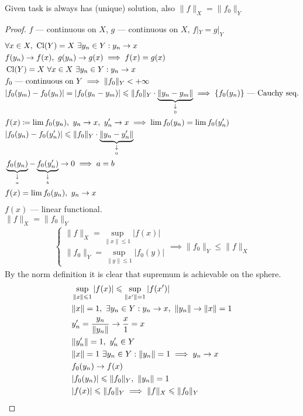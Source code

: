 \begin{thm}
  Given task is always has (unique) solution, also $\|f\|_X = \|f_0\|_Y$
\end{thm}

\begin{proof}
  $f$ --- continuous on $X$, $g$ --- continuous on $X$, $f|_Y = g|_Y$
  \begin{align*}
    &\forall x \in X,\ \cl{Y} = X\ \exists y_n \in Y : y_n \to x \\
    &f(y_n) \to f(x),\ g(y_n) \to g(x) \implies f(x) = g(x) \\
    &\cl{Y} = X\ \forall x \in X\ \exists y_n \in Y : y_n \to x\\
    &f_0\ \text{--- continuous on}\ Y \implies \|f_0\|_Y < +\infty \\
    &|f_0(y_m) - f_0(y_n)| = |f_0(y_n - y_m)| \leq \|f_0\|_Y \cdot \tendsto{\|y_n - y_m\|}{0} \implies \{f_0(y_n)\}\ \text{--- Cauchy seq.} \\
    &f(x) \coloneqq \lim f_0(y_n),\ y_n \to x,\ y_n' \to x \implies \lim f_0(y_n) = \lim f_0(y_n') \\
    &|f_0(y_n) - f_0(y_n')| \leq \|f_0\|_Y \cdot \tendsto{\|y_n - y_n'\|}{0} \\
    &\tendsto{f_0(y_n)}{a} - \tendsto{f_0(y_n')}{b} \to 0 \implies a = b \\
    &f(x) = \lim f_0(y_n),\ y_n \to x
  \end{align*}
  $f(x)$ --- linear functional. \\
  $\|f\|_X = \|f_0\|_Y$
  \begin{align*}
    \begin{cases}
      \|f\|_X = \sup\limits_{\|x\| \leq 1} |f(x)| \\
      \|f_0\|_Y = \sup\limits_{\|y\| \leq 1} |f_0(y)|
    \end{cases}
    \implies \|f_0\|_Y \leq \|f\|_X
  \end{align*}
  By the norm definition it is clear that supremum is achievable on the sphere.
  \begin{align*}
    &\sup_{\|x\| \leq 1}|f(x)| \leq \sup_{\|x'\| = 1} |f(x')| \\
    &\|x\| = 1,\ \exists y_n \in Y : y_n \to x,\ \|y_n\| \to \|x\| = 1 \\
    &y_n' = \dfrac{y_n}{\|y_n\|} \to \dfrac x1 = x \\
    &\|y_n'\| = 1,\ y_n' \in Y \\
    &\|x\| = 1\ \exists y_n \in Y : \|y_n\| = 1 \implies y_n \to x \\
    &f_0(y_n) \to f(x) \\
    &|f_0(y_n)| \leq \|f_0\|_Y,\ \|y_n\| = 1 \\
    &|f(x)| \leq \|f_0\|_Y \implies \|f\|_X \leq \|f_0\|_Y \qedhere 
  \end{align*}
\end{proof}

